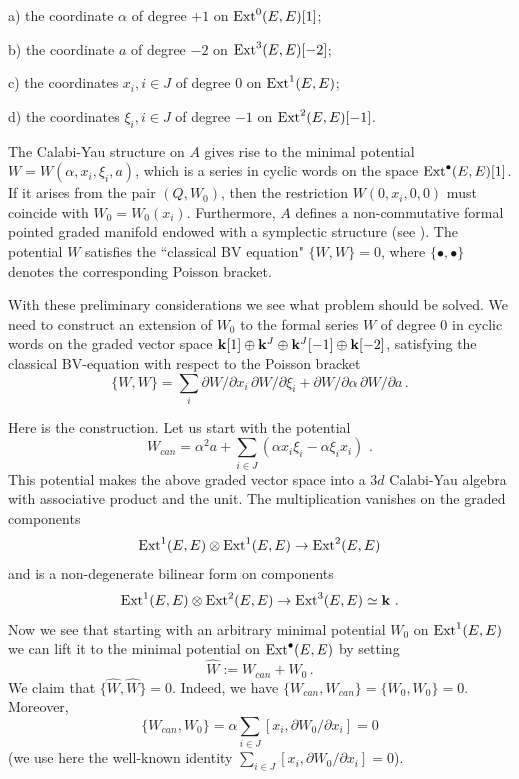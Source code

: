 \documentclass[12pt]{article}
\begin{document}
a) the coordinate $\alpha$ of degree $+1$ on $\operatorname{Ext}^{0}(E,E)[1]$;

b) the coordinate $a$ of degree $-2$ on $\operatorname{Ext}^3(E,E)[-2]$;

c) the coordinates $x_i, i\in J$ of degree $0$ on $\operatorname{Ext}^1(E,E)$;

d) the coordinates $\xi_i, i\in J$ of degree $-1$ on $\operatorname{Ext}^2(E,E)[-1]$.

The Calabi-Yau structure on $A$ gives rise to the minimal potential $W=W(\alpha, x_i,\xi_i,a)$, which is a series in cyclic words on the space  $\operatorname{Ext}^{\bullet}(E,E)[1]$. If it arises from the pair $(Q,W_0)$, then the restriction $W(0,x_i,0,0)$ must coincide with $W_0=W_0(x_i)$. Furthermore, $A$ defines a non-commutative formal pointed graded manifold endowed with a symplectic structure (see \cite{KoSo3}). The potential $W$ satisfies the ``classical BV equation" $\{W,W\}=0$, where $\{\bullet,\bullet \}$ denotes the corresponding Poisson bracket.

With these preliminary considerations we see what problem should be solved. We need to construct an extension of $W_0$ to the formal series  $W$ of degree $0$ in cyclic words on the graded vector space ${\bf k}[1]\oplus {\bf k}^J\oplus {\bf k}^J[-1]\oplus {\bf k}[-2]$,  satisfying the classical BV-equation with respect to the Poisson bracket
$$\{W,W\}=\sum_i\partial W/\partial x_i\,\partial W/\partial \xi_i+\partial W/\partial \alpha \,\partial W/\partial a \,.$$

Here is the construction. Let us start with the potential
$$W_{can}=\alpha^2 a+\sum_{i\in J}(\alpha x_i \xi_i-\alpha \xi_i x_i)\,\,.$$
This potential makes the above graded vector space into a $3d$ Calabi-Yau algebra with associative product and the unit. The multiplication vanishes on the graded components
$$\operatorname{Ext}^1(E,E)\otimes \operatorname{Ext}^1(E,E)\to \operatorname{Ext}^2(E,E)$$ 
and 
is a non-degenerate bilinear form on components 
 $$\operatorname{Ext}^1(E,E)\otimes \operatorname{Ext}^2(E,E)\to \operatorname{Ext}^3(E,E)\simeq {\bf k}\,\,.$$ Now we see that starting with an arbitrary minimal potential $W_0$ on $\operatorname{Ext}^1(E,E)$ we can lift it to the minimal potential on $\operatorname{Ext}^{\bullet}(E,E)$ by setting
$$\widehat{W}:=W_{can}+W_0\,.$$ We claim that $\{\widehat{W},\widehat{W}\}=0$. Indeed, we have
$\{W_{can},W_{can}\}=\{W_0,W_0\}=0$. Moreover,
$$\{W_{can},W_0\}=\alpha\sum_{i\in J}[x_i,\partial W_0/\partial x_i]=0$$ (we use here the  well-known identity  $\sum_{i\in J}[x_i,\partial W_0/\partial x_i]=0$).
\end{document}
